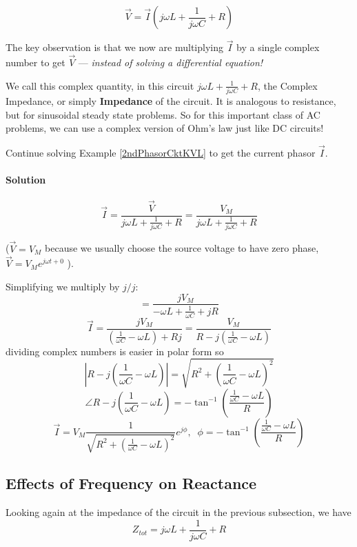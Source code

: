 \[
\vec{V} = \vec{I} \left( j\omega L + \frac {1}  {j\omega C} +   R \right)
\]

The key observation is that we now are multiplying $\vec{I}$ by a single complex number to get $\vec{V}$
--- {\it instead of solving a differential equation!}


We call this complex quantity, in this circuit  $j\omega L + \frac {1}  {j\omega C} +   R $,
the Complex Impedance, or simply {\bf Impedance} of the circuit.
It is analogous to resistance, but   for sinusoidal
steady state problems.
So for this important class of AC problems, we can use a complex version of Ohm's law just
like DC circuits!


\begin{ExampleSmall}
Continue solving Example \ref{2ndPhasorCktKVL} to get the current phasor
$\vec{I}$.

\paragraph{Solution}

\[
\vec{I} = \frac {\vec{V}}  {j\omega L + \frac {1}  {j\omega C} +   R} =
\frac {V_M}  {j\omega L + \frac {1}  {j\omega C} +   R}
\]

($\vec{V} =V_M$
because we usually choose the source voltage to have zero phase,
$\vec{V} = V_Me^{j\omega t + 0}$
).

Simplifying we multiply by $j/j$:
\[
= \frac {jV_M}  {-\omega L + \frac {1}  {\omega C} + jR }
\]
\[
\vec{I} = \frac {jV_M}  {(\frac {1}  {\omega C}-\omega L) + Rj} = \frac {V_M}  {R-j(\frac {1}  {\omega C}-\omega L)}
\]
dividing complex numbers is easier in polar form so
\[
|R-j(\frac {1}  {\omega C}-\omega L)| = \sqrt{R^2+ \left (\frac {1}  {\omega C}-\omega L\right )^2}
\]
\[
\angle{R-j\left (\frac {1}  {\omega C}-\omega L\right )}  = -\tan^{-1}\left ( \frac {\frac {1}  {\omega C}-\omega L}  {R} \right )
\]
\[
\vec{I} = V_M \frac {1}  {\sqrt{R^2+(\frac {1}  {\omega C}-\omega L)^2}}e^{j\phi},\;\; \phi =  -\tan^{-1}\left ( \frac {\frac {1}  {\omega C}-\omega L}  {R} \right )
\]
\end{ExampleSmall}



\subsection{Effects of Frequency on Reactance}

Looking again at the impedance of the circuit in the previous subsection, we have
\[
Z_{tot}  =  j\omega L + \frac {1}  {j\omega C} +   R
\]

